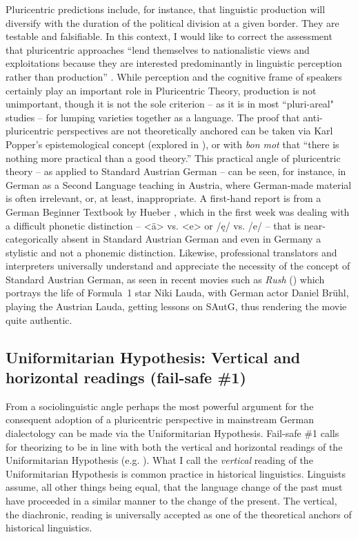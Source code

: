 \documentclass[output=paper]{langscibook}
\begin{document}
Pluricentric predictions include, for instance, that linguistic production will diversify with the duration of the political division at a given border. They are testable and falsifiable. In this context, I would like to correct the assessment that pluricentric approaches “lend themselves to nationalistic views and exploitations because they are interested predominantly in linguistic perception rather than production” \citep[470--471]{Schneider2022}. While perception and the cognitive frame of speakers certainly play an important role in Pluricentric Theory, production is not unimportant, though it is not the sole criterion – as it is in most ``pluri-areal" studies – for lumping varieties together as a language. The proof that anti-pluricentric perspectives are not theoretically anchored can be taken via Karl Popper’s epistemological concept (explored in \citealt[89--90]{Dollinger2019c}), or with  \textit{bon mot} that “there is nothing more practical than a good theory.” This practical angle of pluricentric theory – as applied to Standard Austrian German – can be seen, for instance, in German as a Second Language teaching in Austria, where German-made material is often irrelevant, or, at least, inappropriate. A first-hand report is from a German Beginner Textbook by Hueber \citep[59--60]{Dollinger2021}, which in the first week was dealing with a difficult phonetic distinction -- <ä> vs. <e> or /ę/ vs. /e/ -- that is near-categorically absent in Standard Austrian German and even in Germany a stylistic and not a phonemic distinction. Likewise, professional translators and interpreters universally understand and appreciate the necessity of the concept of Standard Austrian German, as seen in recent movies such as \textit{Rush} (\citeyear{Howard2013}) which portrays the life of Formula~1 star Niki Lauda, with German actor Daniel Brühl, playing the Austrian Lauda, getting lessons on SAutG, thus rendering the movie quite authentic.

\subsection{Uniformitarian Hypothesis: Vertical and horizontal readings (fail-safe \#1)}\label{sec:dollinger:4.3}

From a sociolinguistic angle perhaps the most powerful argument for the consequent adoption of a pluricentric perspective in mainstream German dialectology can be made via the Uniformitarian Hypothesis.  Fail-safe \#1 \citep[109--111]{Dollinger2019c} calls for theorizing to be in line with both the vertical and horizontal readings of the Uniformitarian Hypothesis (e.g. \citealt[21]{Labov1994}). What I call the \textit{vertical} reading of the Uniformitarian Hypothesis is common practice in historical linguistics. Linguists assume, all other things being equal, that the language change of the past must have proceeded in a similar manner to the change of the present. The vertical, the diachronic, reading is universally accepted as one of the theoretical anchors of historical linguistics.
\end{document}
